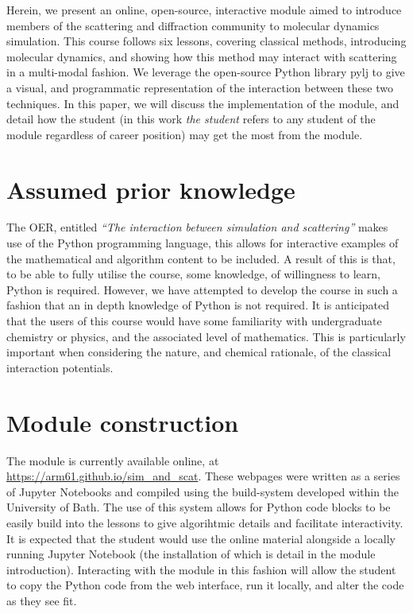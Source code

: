 \documentclass[pdf]{iucr}              %
\begin{document}
Herein, we present an online, open-source, interactive module aimed to introduce members of the scattering and diffraction community to molecular dynamics simulation.
This course follows six lessons, covering classical methods, introducing molecular dynamics, and showing how this method may interact with scattering in a multi-modal fashion.
We leverage the open-source Python library pylj \cite{McCluskey2018} to give a visual, and programmatic representation of the interaction between these two techniques.
In this paper, we will discuss the implementation of the module, and detail how the student (in this work \emph{the student} refers to any student of the module regardless of career position) may get the most from the module.

\section{Assumed prior knowledge}

The OER, entitled \emph{``The interaction between simulation and scattering''} makes use of the Python programming language, this allows for interactive examples of the mathematical and algorithm content to be included.
A result of this is that, to be able to fully utilise the course, some knowledge, of willingness to learn, Python is required.
However, we have attempted to develop the course in such a fashion that an in depth knowledge of Python is not required.
It is anticipated that the users of this course would have some familiarity with undergraduate chemistry or physics, and the associated level of mathematics.
This is particularly important when considering the nature, and chemical rationale, of the classical interaction potentials.

\section{Module construction}

The module is currently available online, at \url{https://arm61.github.io/sim_and_scat}.
These webpages were written as a series of Jupyter Notebooks and compiled using the build-system developed within the University of Bath.
The use of this system allows for Python code blocks to be easily build into the lessons to give algorihtmic details and facilitate interactivity.
It is expected that the student would use the online material alongside a locally running Jupyter Notebook (the installation of which is detail in the module introduction).
Interacting with the module in this fashion will allow the student to copy the Python code from the web interface, run it locally, and alter the code as they see fit.
\end{document}
